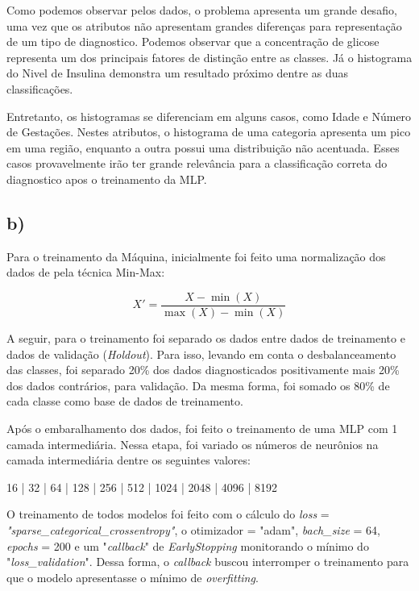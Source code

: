 \documentclass[12pt]{article}
\begin{document}
Como podemos observar pelos dados, o problema apresenta um grande desafio, uma vez que os atributos não apresentam grandes diferenças para representação de um tipo de diagnostico. Podemos observar que a concentração de glicose representa um dos principais fatores de distinção entre as classes. Já o histograma do Nivel de Insulina demonstra um resultado próximo dentre as duas classificações.

Entretanto, os histogramas se diferenciam em alguns casos, como Idade e Número de Gestações. Nestes atributos, o histograma de uma categoria apresenta um pico em uma região, enquanto a outra possui uma distribuição não acentuada. Esses casos provavelmente irão ter grande relevância para a classificação correta do diagnostico apos o treinamento da MLP.

\subsection*{b)}

Para o treinamento da Máquina, inicialmente foi feito uma normalização dos dados de pela técnica Min-Max:

\begin{equation}
X' = \frac{X - \min(X)}{\max(X)-\min(X)}
\end{equation}

A seguir, para o treinamento foi separado os dados entre dados de treinamento e dados de validação (\textit{Holdout}). Para isso, levando em conta o desbalanceamento das classes, foi separado 20\% dos dados diagnosticados positivamente mais 20\% dos dados contrários, para validação. Da mesma forma, foi somado os 80\% de cada classe como base de dados de treinamento. 

Após o embaralhamento dos dados, foi feito o treinamento de uma MLP com 1 camada intermediária. Nessa etapa, foi variado os números de neurônios na camada intermediária dentre os seguintes valores: 
\begin{center}
	16 | 32 | 64 | 128 | 256 | 512 | 1024 | 2048 | 4096 | 8192
\end{center}

O treinamento de todos modelos foi feito com o cálculo do \textit{loss} = \textit{"sparse\_categorical\_crossentropy"}, o otimizador = "adam", \textit{bach\_size} = 64, \textit{epochs} = 200 e  um "\textit{callback}" de \textit{EarlyStopping} monitorando o mínimo do "\textit{loss\_validation}". Dessa forma, o \textit{callback} buscou interromper o treinamento para que o modelo apresentasse o mínimo de \textit{overfitting}.
\end{document}
